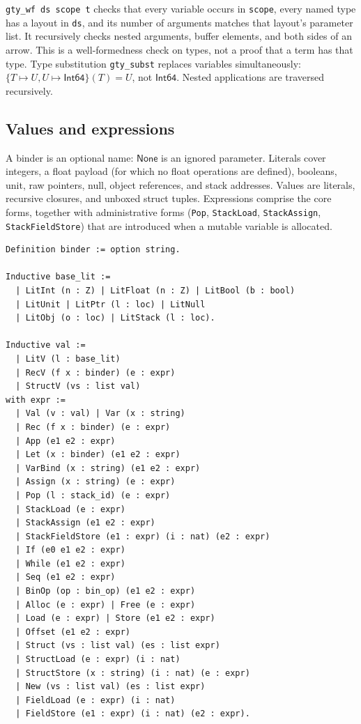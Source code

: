 \documentclass[11pt]{article}
\begin{document}
\texttt{gty\_wf ds scope t} checks that every variable occurs in
\texttt{scope}, every named type has a layout in \texttt{ds}, and its number
of arguments matches that layout's parameter list. It recursively checks
nested arguments, buffer elements, and both sides of an arrow. This is a well-formedness
check on types, not a proof that a term has that type.
Type substitution \texttt{gty\_subst} replaces variables simultaneously:
\(\{T\mapsto U,U\mapsto\mathsf{Int64}\}(T)=U\), not
\(\mathsf{Int64}\). Nested applications are traversed recursively.

\subsection{Values and expressions}

A binder is an optional name: \(\mathsf{None}\) is an ignored parameter.
Literals cover integers, a float payload (for which no float operations are defined), booleans, unit, raw pointers, null, object references, and stack addresses.
Values are literals, recursive closures, and unboxed struct tuples.
Expressions comprise the core forms, together with administrative forms (\texttt{Pop}, \texttt{StackLoad}, \texttt{StackAssign}, \texttt{StackFieldStore}) that are introduced when a mutable variable is allocated.

\begin{lstlisting}
Definition binder := option string.

Inductive base_lit :=
  | LitInt (n : Z) | LitFloat (n : Z) | LitBool (b : bool)
  | LitUnit | LitPtr (l : loc) | LitNull
  | LitObj (o : loc) | LitStack (l : loc).

Inductive val :=
  | LitV (l : base_lit)
  | RecV (f x : binder) (e : expr)
  | StructV (vs : list val)
with expr :=
  | Val (v : val) | Var (x : string)
  | Rec (f x : binder) (e : expr)
  | App (e1 e2 : expr)
  | Let (x : binder) (e1 e2 : expr)
  | VarBind (x : string) (e1 e2 : expr)
  | Assign (x : string) (e : expr)
  | Pop (l : stack_id) (e : expr)
  | StackLoad (e : expr)
  | StackAssign (e1 e2 : expr)
  | StackFieldStore (e1 : expr) (i : nat) (e2 : expr)
  | If (e0 e1 e2 : expr)
  | While (e1 e2 : expr)
  | Seq (e1 e2 : expr)
  | BinOp (op : bin_op) (e1 e2 : expr)
  | Alloc (e : expr) | Free (e : expr)
  | Load (e : expr) | Store (e1 e2 : expr)
  | Offset (e1 e2 : expr)
  | Struct (vs : list val) (es : list expr)
  | StructLoad (e : expr) (i : nat)
  | StructStore (x : string) (i : nat) (e : expr)
  | New (vs : list val) (es : list expr)
  | FieldLoad (e : expr) (i : nat)
  | FieldStore (e1 : expr) (i : nat) (e2 : expr).
\end{lstlisting}
\end{document}
